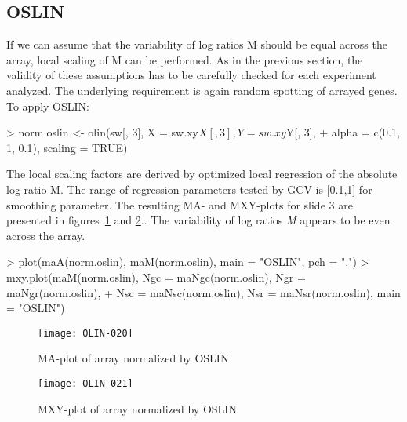 \documentclass[a4paper,11pt]{article}
\begin{document}



\subsection{OSLIN} 
If we can assume that the variability of log ratios M should be equal across the array,
 local scaling of M can be performed. As in the previous section, the validity of these assumptions
 has to be carefully checked for each experiment analyzed. The underlying requirement is again random 
spotting of arrayed genes. To apply OSLIN:

\begin{Schunk}
\begin{Sinput}
> norm.oslin <- olin(sw[, 3], X = sw.xy$X[, 3], Y = sw.xy$Y[, 3], 
+     alpha = c(0.1, 1, 0.1), scaling = TRUE)
\end{Sinput}
\end{Schunk}

The local scaling factors are  derived by optimized local regression of the absolute log ratio M. 
The range of regression  parameters tested by GCV is [0.1,1] for smoothing parameter. 
The resulting MA- and MXY-plots for slide 3 are presented in figures~\ref{maoslin} and \ref{mxyoslin}.. 
The variability of log ratios \emph{M} appears to be even across the array.


\begin{Schunk}
\begin{Sinput}
> plot(maA(norm.oslin), maM(norm.oslin), main = "OSLIN", pch = ".")
> mxy.plot(maM(norm.oslin), Ngc = maNgc(norm.oslin), Ngr = maNgr(norm.oslin), 
+     Nsc = maNsc(norm.oslin), Nsr = maNsr(norm.oslin), main = "OSLIN")
\end{Sinput}
\end{Schunk}



\begin{figure}
\centering
\texttt{[image: OLIN-020]}
\caption{MA-plot of array normalized by  OSLIN }
\label{maoslin}
\end{figure}



\begin{figure}
\centering
\texttt{[image: OLIN-021]}
\caption{MXY-plot of array normalized by  OSLIN }
\label{mxyoslin}
\end{figure}
\end{document}
